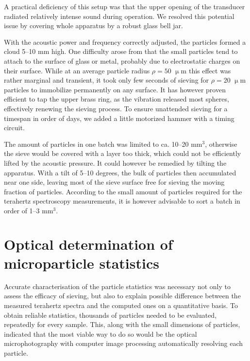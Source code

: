 A practical deficiency of this setup was that the upper opening of the transducer radiated relatively intense sound during operation. We resolved this potential issue by covering whole apparatus by a robust glass bell jar.

With the acoustic power and frequency correctly adjusted, the particles formed a cloud 5--10 mm high. One difficulty arose from that the small particles tend to attach to the surface of glass or metal, probably due to electrostatic charges on their surface. While at an average particle radius $\rho = 50$ $\upmu$m this effect was rather marginal and transient, it took only few seconds of sieving for $\rho = 20$ $\upmu$m particles to immobilize permanently on any surface. It has however proven efficient to tap the upper brass ring, as the vibration released most spheres, effectively renewing the sieving process. To ensure unattended sieving for a timespan in order of days, we added a little motorized hammer with a timing circuit. %

The amount of particles in one batch was limited to ca. 10--20 mm$^{3}$, otherwise the sieve would be covered with a layer too thick, which could not be efficiently lifted by the acoustic pressure.
It could however be remedied by tilting the apparatus. With a tilt of 5--10 degrees, the bulk of particles then accumulated near one side, leaving most of the sieve surface free for sieving the moving fraction of particles. According to the small amount of particles required for the terahertz spectroscopy measurements, it is however advisable to sort a batch in order of 1--3 mm$^{3}$.

\section{Optical determination of microparticle statistics}
Accurate characterisation of the particle statistics was necessary not only to assess the efficacy of sieving, but also to explain possible difference between the measured terahertz spectra and the computed ones on a quantitative basis. To obtain reliable statistics, thousands of particles needed to be evaluated, repeatedly for every sample. This, along with the small dimensions of particles, indicated that the most viable way to do so would be the optical microphotography with computer image processing automatically resolving each particle.

